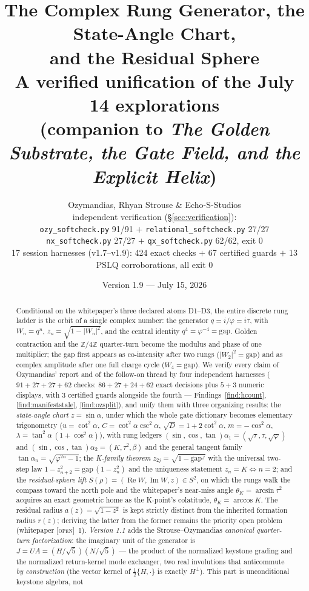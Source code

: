 \documentclass[11pt]{article}
\title{\bfseries The Complex Rung Generator, the State-Angle Chart,\\
and the Residual Sphere\\[4pt]
\large A verified unification of the July 14 explorations\\
(companion to \emph{The Golden Substrate, the Gate Field, and the Explicit Helix})}
\author{Ozymandias, Rhyan Strouse \& Echo-S-Studios\\[2pt]
\small independent verification (\S\ref{sec:verification}):\\
\small \texttt{ozy\_softcheck.py} 91/91 $+$ \texttt{relational\_softcheck.py} 27/27\\
\small \texttt{nx\_softcheck.py} 27/27 $+$ \texttt{qx\_softcheck.py} 62/62, exit 0\\
\small 17 session harnesses (v1.7--v1.9): 424 exact checks $+$ 67 certified guards $+$ 13 PSLQ corroborations, all exit 0}
\date{Version 1.9 --- July 15, 2026}
\newcommand{\tagO}{\textcolor{cO}{\textsc{[open]}}}
\newcommand{\Z}{\mathbb{Z}}
\newcommand{\gp}{\varphi}
\newcommand{\gapc}{\mathrm{gap}}
\DeclareMathOperator{\Rea}{Re}
\DeclareMathOperator{\Ima}{Im}
\theoremstyle{plain}
\theoremstyle{definition}
\theoremstyle{remark}
\begin{document}
\maketitle

\begin{abstract}
\noindent
Conditional on the whitepaper's three declared atoms D1--D3, the entire discrete
rung ladder is the orbit of a single complex number: the generator
$q=i/\gp=i\tau$, with $W_n=q^n$, $z_n=\sqrt{1-|W_n|^2}$, and the central identity
$q^4=\gp^{-4}=\gapc$. Golden contraction and the $\Z/4\Z$ quarter-turn become the
modulus and phase of one multiplier; the gap first appears as co-intensity after
two rungs ($|W_2|^2=\gapc$) and as complex amplitude after one full charge cycle
($W_4=\gapc$). We verify every claim of Ozymandias' report and of the follow-on
thread by four independent harnesses ($91+27+27+62$ checks: $86{+}27{+}24{+}62$
exact decisions plus $5{+}3$ numeric displays, with $3$ certified guards
alongside the fourth --- Findings~\ref{find:hcount}, \ref{find:manifeststale},
\ref{find:ozsplit}), and unify them with three
organizing results: the \emph{state-angle chart} $z=\sin\alpha$, under which the
whole gate dictionary becomes elementary trigonometry ($u=\cot^2\alpha$,
$C=\cot^2\alpha\csc^2\alpha$, $\sqrt D=1+2\cot^2\alpha$, $m=-\cos^2\alpha$,
$\lambda=\tan^2\alpha\,(1+\cos^2\alpha)$), with rung ledgers
$(\sin,\cos,\tan)\alpha_1=(\sqrt\tau,\tau,\sqrt\gp)$ and
$(\sin,\cos,\tan)\alpha_2=(K,\tau^2,\beta)$ and the general tangent family
$\tan\alpha_n=\sqrt{\gp^{2n}-1}$; the \emph{K-family theorem}
$z_{2j}=\sqrt{1-\gapc^{\,j}}$ with the universal two-step law
$1-z_{n+2}^2=\gapc\,(1-z_n^2)$ and the uniqueness statement $z_n=K\iff n=2$; and
the \emph{residual-sphere lift} $S(\rho)=(\Rea W,\Ima W,z)\in S^2$, on which the
rungs walk the compass toward the north pole and the whitepaper's near-miss angle
$\theta_K=\arcsin\tau^2$ acquires an exact geometric home as the K-point's
colatitude, $\theta_K=\arccos K$. The residual radius $a(z)=\sqrt{1-z^2}$ is kept
strictly distinct from the inherited formation radius $r(z)$; deriving the latter
from the former remains the priority open problem (whitepaper \tagO{}~1). \emph{Version 1.1}
adds the Strouse--Ozymandias \emph{canonical quarter-turn factorization}: the
imaginary unit of the generator is
$J=UA=(H/\sqrt5)(N/\sqrt5)$ --- the product of the normalized keystone grading
and the normalized return-kernel mode exchanger, two real involutions that
anticommute \emph{by construction} (the vector kernel of $\tfrac12\{H,\cdot\}$
is exactly $H^\perp$). This part is unconditional keystone algebra, not

\end{abstract}
\end{document}
